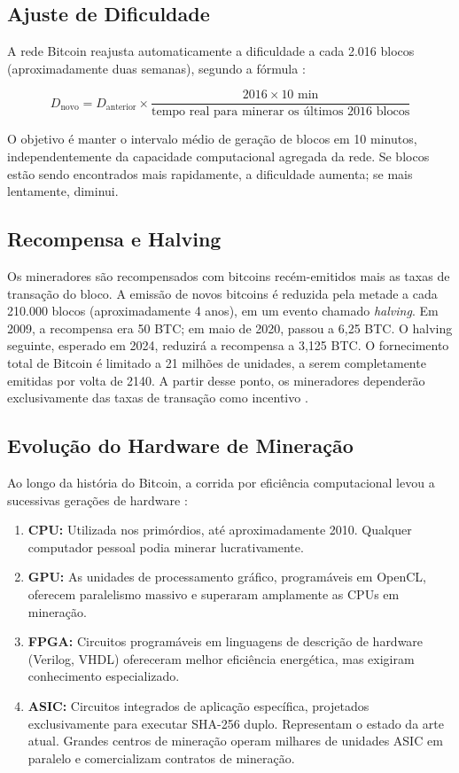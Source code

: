 \documentclass[12pt,a4paper]{report}
\begin{document}
\subsection{Ajuste de Dificuldade}

A rede Bitcoin reajusta automaticamente a dificuldade a cada 2.016 blocos (aproximadamente duas semanas), segundo a fórmula \cite{Bashir2023}:

\[
D_{\text{novo}} = D_{\text{anterior}} \times \frac{2016 \times 10\text{ min}}{\text{tempo real para minerar os últimos 2016 blocos}}
\]

O objetivo é manter o intervalo médio de geração de blocos em 10 minutos, independentemente da capacidade computacional agregada da rede. Se blocos estão sendo encontrados mais rapidamente, a dificuldade aumenta; se mais lentamente, diminui.

\subsection{Recompensa e Halving}

Os mineradores são recompensados com bitcoins recém-emitidos mais as taxas de transação do bloco. A emissão de novos bitcoins é reduzida pela metade a cada 210.000 blocos (aproximadamente 4 anos), em um evento chamado \textit{halving}. Em 2009, a recompensa era 50 BTC; em maio de 2020, passou a 6,25 BTC. O halving seguinte, esperado em 2024, reduzirá a recompensa a 3,125 BTC. O fornecimento total de Bitcoin é limitado a 21 milhões de unidades, a serem completamente emitidas por volta de 2140. A partir desse ponto, os mineradores dependerão exclusivamente das taxas de transação como incentivo \cite{Bashir2023}.

\subsection{Evolução do Hardware de Mineração}

Ao longo da história do Bitcoin, a corrida por eficiência computacional levou a sucessivas gerações de hardware \cite{Bashir2023}:

\begin{enumerate}
    \item \textbf{CPU:} Utilizada nos primórdios, até aproximadamente 2010. Qualquer computador pessoal podia minerar lucrativamente.
    \item \textbf{GPU:} As unidades de processamento gráfico, programáveis em OpenCL, oferecem paralelismo massivo e superaram amplamente as CPUs em mineração.
    \item \textbf{FPGA:} Circuitos programáveis em linguagens de descrição de hardware (Verilog, VHDL) ofereceram melhor eficiência energética, mas exigiram conhecimento especializado.
    \item \textbf{ASIC:} Circuitos integrados de aplicação específica, projetados exclusivamente para executar SHA-256 duplo. Representam o estado da arte atual. Grandes centros de mineração operam milhares de unidades ASIC em paralelo e comercializam contratos de mineração.
\end{enumerate}
\end{document}
